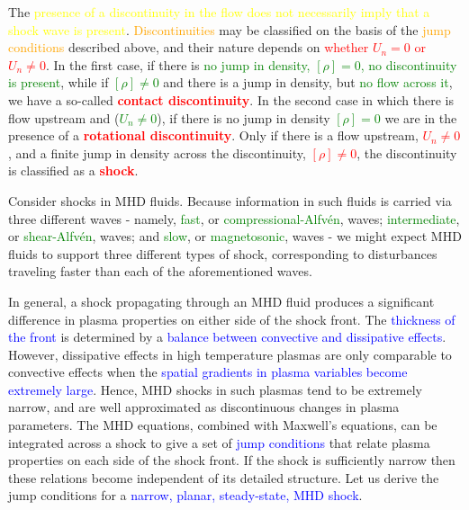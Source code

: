 \documentclass[12pt,a4paper]{article}
\begin{document}
The \textcolor{yellow}{presence of a discontinuity in the flow does not necessarily imply that a shock wave is present}. \textcolor{orange}{Discontinuities} may be classified on the basis of the \textcolor{orange}{jump conditions} described above, and their nature depends on \textcolor{red}{whether $U_n = 0$ or $U_n \neq 0$}. In the first case, if there is \textcolor{green}{no jump in density, $[\rho] = 0$, no discontinuity is present}, while if \textcolor{green}{$[\rho] \neq 0$} and there is a jump in density, but \textcolor{green}{no flow across it}, we have a so-called \textcolor{red}{\bf contact discontinuity}. In the second case in which there is flow upstream and (\textcolor{green}{$U_n \neq 0$}), if there is no jump in density \textcolor{green}{$[\rho] = 0$} we are in the presence of a \textcolor{red}{\bf rotational discontinuity}. Only if there is a flow upstream, \textcolor{red}{$U_n \neq 0$}, and a finite jump in density across the discontinuity, \textcolor{red}{$[\rho] \neq 0$}, the discontinuity is classified as a \textcolor{red}{\bf shock}.

\cite{Plasma2014} Consider shocks in MHD fluids. Because information in such fluids is carried via three different waves - namely, \textcolor{green}{fast}, or \textcolor{green}{compressional-Alfv\'en}, waves; \textcolor{green}{intermediate}, or \textcolor{green}{shear-Alfv\'en}, waves; and \textcolor{green}{slow}, or \textcolor{green}{magnetosonic}, waves - we might expect MHD fluids to support three different types of shock, corresponding to disturbances traveling faster than each of the aforementioned waves. 

In general, a shock propagating through an MHD fluid produces a significant difference in plasma properties on either side of the shock front. The \textcolor{blue}{thickness of the front} is determined by a \textcolor{blue}{balance between convective and dissipative effects}. However, dissipative effects in high temperature plasmas are only comparable to convective effects when the \textcolor{blue}{spatial gradients in plasma variables become extremely large}. Hence, MHD shocks in such plasmas tend to be extremely narrow, and are well approximated as discontinuous changes in plasma parameters. The MHD equations, combined with Maxwell's equations, can be integrated across a shock to give a set of \textcolor{blue}{jump conditions} that relate plasma properties on each side of the shock front. If the shock is sufficiently narrow then these relations become independent of its detailed structure. Let us derive the jump conditions for a \textcolor{blue}{narrow, planar, steady-state, MHD shock}.
\end{document}
